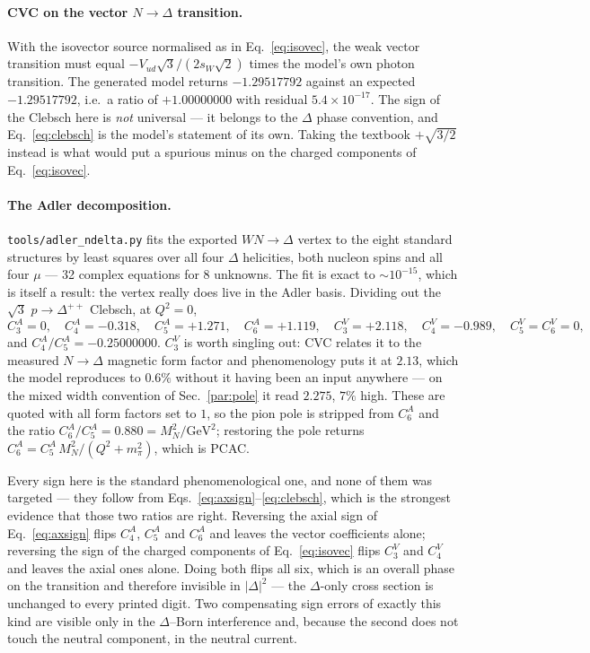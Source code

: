 \documentclass[11pt,a4paper]{article}
\newcommand{\code}[1]{\texttt{\small #1}}
\begin{document}
\paragraph{CVC on the vector $N\to\Delta$ transition.}
With the isovector source normalised as in Eq.~\eqref{eq:isovec}, the weak
vector transition must equal
$-V_{ud}\sqrt{3}/(2 s_W \sqrt 2)$ times the model's own photon transition. The
generated model returns $-1.29517792$ against an expected $-1.29517792$, i.e.\
a ratio of $+1.00000000$ with residual $5.4\times10^{-17}$. The sign of the
Clebsch here is \emph{not} universal --- it belongs to the $\Delta$ phase
convention, and Eq.~\eqref{eq:clebsch} is the model's statement of its own.
Taking the textbook $+\sqrt{3/2}$ instead is what would put a spurious minus on
the charged components of Eq.~\eqref{eq:isovec}.

\paragraph{The Adler decomposition.}
\code{tools/adler\_ndelta.py} fits the exported $W N\to\Delta$ vertex to the
eight standard structures by least squares over all four $\Delta$ helicities,
both nucleon spins and all four $\mu$ --- 32 complex equations for 8 unknowns.
The fit is exact to $\sim\!10^{-15}$, which is itself a result: the vertex
really does live in the Adler basis. Dividing out the $\sqrt3$
$p\to\Delta^{++}$ Clebsch, at $Q^2 = 0$,
\begin{equation}
  C_3^A = 0,\quad
  C_4^A = -0.318,\quad
  C_5^A = +1.271,\quad
  C_6^A = +1.119,\quad
  C_3^V = +2.118,\quad
  C_4^V = -0.989,\quad
  C_5^V = C_6^V = 0 ,
\end{equation}
and $C_4^A/C_5^A = -0.25000000$. $C_3^V$ is worth singling out: CVC relates it
to the measured $N\to\Delta$ magnetic form factor and phenomenology puts it at
$2.13$, which the model reproduces to $0.6\%$ without it having been an input
anywhere --- on the mixed width convention of Sec.~\ref{par:pole} it read
$2.275$, $7\%$ high. These are quoted with all form factors set to
$1$, so the pion pole is stripped from $C_6^A$ and the ratio
$C_6^A/C_5^A = 0.880 = M_N^2/\mathrm{GeV}^2$; restoring the pole returns
$C_6^A = C_5^A\,M_N^2/(Q^2+m_\pi^2)$, which is PCAC.

Every sign here is the standard phenomenological one, and none of them was
targeted --- they follow from Eqs.~\eqref{eq:axsign}--\eqref{eq:clebsch}, which
is the strongest evidence that those two ratios are right. Reversing the axial
sign of Eq.~\eqref{eq:axsign} flips $C_4^A$, $C_5^A$ and $C_6^A$ and leaves the
vector coefficients alone; reversing the sign of the charged components of
Eq.~\eqref{eq:isovec} flips $C_3^V$ and $C_4^V$ and leaves the axial ones alone.
Doing both flips all six, which is an overall phase on the transition and
therefore invisible in $|\Delta|^2$ --- the $\Delta$-only cross section is
unchanged to every printed digit. Two compensating sign errors of exactly this
kind are visible only in the $\Delta$--Born interference and, because the second
does not touch the neutral component, in the neutral current.
\end{document}
